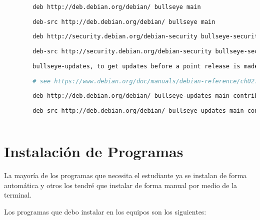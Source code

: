 	\begin{lstlisting}[language=bash, caption=Repositorios]
		
		deb http://deb.debian.org/debian/ bullseye main
		
		deb-src http://deb.debian.org/debian/ bullseye main
		 
		deb http://security.debian.org/debian-security bullseye-security main contrib
		
		deb-src http://security.debian.org/debian-security bullseye-security main contrib
		 
		bullseye-updates, to get updates before a point release is made;
		
		# see https://www.debian.org/doc/manuals/debian-reference/ch02.en.html#_updates_and_backports
		
		deb http://deb.debian.org/debian/ bullseye-updates main contrib
		
		deb-src http://deb.debian.org/debian/ bullseye-updates main contrib
		
	\end{lstlisting}	
			
	\section{Instalación de Programas}
		
		La mayoría de los programas que necesita el estudiante ya se instalan de forma automática y otros los tendré que instalar de forma manual por medio de la terminal.\par
		
		Los programas que debo instalar en los equipos son los siguientes:\par
		

